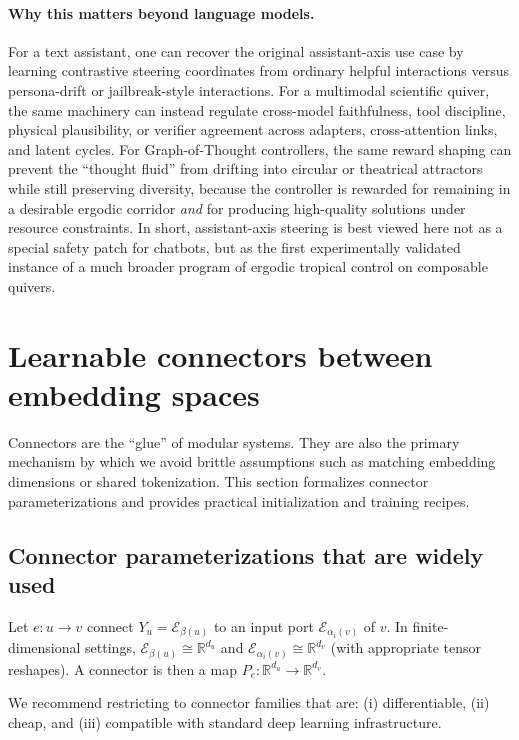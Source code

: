 \documentclass[11pt]{article}
\theoremstyle{definition}
\theoremstyle{plain}
\theoremstyle{remark}
\newcommand{\R}{\mathbb{R}}
\newcommand{\mc}[1]{\mathcal{#1}}
\newcommand{\Emb}{\mc{E}}
\begin{document}
\paragraph{Why this matters beyond language models.}
For a text assistant, one can recover the original assistant-axis use case by learning contrastive steering coordinates from ordinary helpful interactions versus persona-drift or jailbreak-style interactions.
For a multimodal scientific quiver, the same machinery can instead regulate cross-model faithfulness, tool discipline, physical plausibility, or verifier agreement across adapters, cross-attention links, and latent cycles.
For Graph-of-Thought controllers, the same reward shaping can prevent the ``thought fluid'' from drifting into circular or theatrical attractors while still preserving diversity, because the controller is rewarded for remaining in a desirable ergodic corridor \emph{and} for producing high-quality solutions under resource constraints.
In short, assistant-axis steering is best viewed here not as a special safety patch for chatbots, but as the first experimentally validated instance of a much broader program of ergodic tropical control on composable quivers.

\newpage

\section{Learnable connectors between embedding spaces}
\label{sec:connectors}

Connectors are the ``glue'' of modular systems.
They are also the primary mechanism by which we avoid brittle assumptions such as matching embedding dimensions or shared tokenization.
This section formalizes connector parameterizations and provides practical initialization and training recipes.

\subsection{Connector parameterizations that are widely used}
\label{sec:connector-params}

Let $e:u\to v$ connect $Y_u=\Emb_{\beta(u)}$ to an input port $\Emb_{\alpha_i(v)}$ of $v$.
In finite-dimensional settings, $\Emb_{\beta(u)}\cong \R^{d_u}$ and $\Emb_{\alpha_i(v)}\cong \R^{d_v}$ (with appropriate tensor reshapes).
A connector is then a map $P_e:\R^{d_u}\to\R^{d_v}$.

We recommend restricting to connector families that are:
(i) differentiable, (ii) cheap, and (iii) compatible with standard deep learning infrastructure.
\end{document}
